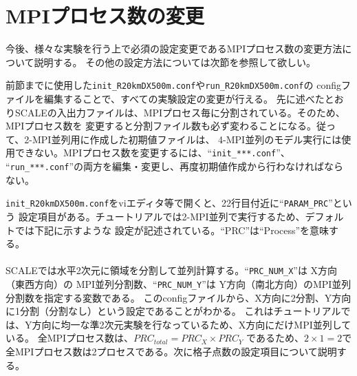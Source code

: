 

\section{MPIプロセス数の変更}
今後、様々な実験を行う上で必須の設定変更であるMPIプロセス数の変更方法について説明する。
その他の設定方法については次節を参照して欲しい。

前節までに使用した\verb|init_R20kmDX500m.conf|や\verb|run_R20kmDX500m.conf|の
configファイルを編集することで、すべての実験設定の変更が行える。
先に述べたとおりSCALEの入出力ファイルは、MPIプロセス毎に分割されている。そのため、MPIプロセス数を
変更すると分割ファイル数も必ず変わることになる。従って、2-MPI並列用に作成した初期値ファイルは、
4-MPI並列のモデル実行には使用できない。MPIプロセス数を変更するには、``\verb|init_***.conf|''、
``\verb|run_***.conf|''の両方を編集・変更し、再度初期値作成から行わなければならない。

\verb|init_R20kmDX500m.conf|をviエディタ等で開くと、22行目付近に``\verb|PARAM_PRC|''という
設定項目がある。チュートリアルでは2-MPI並列で実行するため、デフォルトでは下記に示すような
設定が記述されている。``PRC''は``Process''を意味する。\\

\\

SCALEでは水平2次元に領域を分割して並列計算する。``\verb|PRC_NUM_X|''は X方向（東西方向）の
MPI並列分割数、``\verb|PRC_NUM_Y|''は Y方向（南北方向）のMPI並列分割数を指定する変数である。
このconfigファイルから、X方向に2分割、Y方向に1分割（分割なし）という設定であることがわかる。
これはチュートリアルでは、Y方向に均一な準2次元実験を行なっているため、X方向にだけMPI並列している。
全MPIプロセス数は、${PRC}_{total}={PRC}_{X} \times {PRC}_{Y}$ であるため、$2 \times 1 = 2$で
全MPIプロセス数は2プロセスである。次に格子点数の設定項目について説明する。\\

